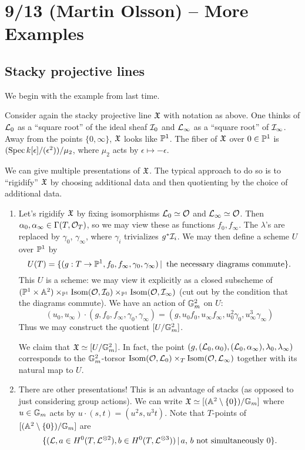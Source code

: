 \documentclass{amsart}
\begin{document}
\section{9/13 (Martin Olsson) -- More Examples}

\subsection{Stacky projective lines}

We begin with the example from last time.

\begin{ex}
	Consider again the stacky projective line $\mathfrak{X}$ with notation as above.
	One thinks of $\mathcal{L}_0$ as a ``square root'' of the ideal sheaf $\mathcal{I}_0$ and $\mathcal{L}_\infty$ as a ``square root'' of $\mathcal{I}_\infty$.
	Away from the points $\{0, \infty\}$, $\mathfrak{X}$ looks like $\mathbb{P}^1$.
	The fiber of $\mathfrak{X}$ over $0 \in \mathbb{P}^1$ is $(\operatorname{Spec} k[\epsilon] / (\epsilon^2)) / \mu_2$, where $\mu_2$ acts by $\epsilon \mapsto -\epsilon$.

	We can give multiple presentations of $\mathfrak{X}$.
	The typical approach to do so is to ``rigidify'' $\mathfrak{X}$ by choosing additional data and then quotienting by the choice of additional data.
	\begin{enumerate}
		\item Let's rigidify $\mathfrak{X}$ by fixing isomorphisms $\mathcal{L}_0 \simeq \mathcal{O}$ and $\mathcal{L}_\infty \simeq \mathcal{O}$.
			Then $\alpha_0, \alpha_\infty \in \Gamma(T, \mathcal{O}_T)$, so we may view these as functions $f_0, f_\infty$.
			The $\lambda$'s are replaced by $\gamma_0$, $\gamma_\infty$, where $\gamma_i$ trivializes $g^* \mathcal{I}_i$.
			We may then define a scheme $U$ over $\mathbb{P}^1$ by
			\[
				U(T) = \{ (g: T \to \mathbb{P}^1, f_0, f_\infty, \gamma_0, \gamma_\infty) \,|\, \textrm{ the necessary diagrams commute} \}.
			\]
			This $U$ is a scheme: we may view it explicitly as a closed subscheme of $(\mathbb{P}^1 \times \mathbb{A}^2) \times_{\mathbb{P}^1} \operatorname{Isom}(\mathcal{O}, \mathcal{I}_0) \times_{\mathbb{P}^1} \operatorname{Isom}(\mathcal{O}, \mathcal{I}_\infty)$ (cut out by the condition that the diagrams commute).
			We have an action of $\mathbb{G}_m^2$ on $U$:
			\[
				(u_0, u_\infty) \cdot (g, f_0, f_\infty, \gamma_0, \gamma_\infty) = (g, u_0 f_0, u_\infty f_\infty, u^2_0 \gamma_0, u_\infty^3 \gamma_\infty)
			\]
			Thus we may construct the quotient $[U / \mathbb{G}_m^2]$.

			We claim that $\mathfrak{X} \simeq [U / \mathbb{G}_m^2]$.
			In fact, the point $(g, (\mathcal{L}_0, \alpha_0), (\mathcal{L}_0, \alpha_\infty), \lambda_0, \lambda_\infty)$ corresponds to the $\mathbb{G}_m^2$-torsor $\operatorname{Isom}(\mathcal{O}, \mathcal{L}_0) \times_T \operatorname{Isom}(\mathcal{O}, \mathcal{L}_\infty)$ together with its natural map to $U$.
		\item There are other presentations!
			This is an advantage of stacks (as opposed to just considering group actions).
			We can write $\mathfrak{X} \simeq [(\mathbb{A}^2 \setminus \{ 0 \}) / \mathbb{G}_m]$ where $u \in \mathbb{G}_m$ acts by $u \cdot (s, t) = (u^2 s, u^3 t)$.
			Note that $T$-points of $[(\mathbb{A}^2 \setminus \{ 0 \}) / \mathbb{G}_m]$ are 
			\[
				\{ (\mathcal{L}, a \in H^0(T, \mathcal{L}^{\otimes 2}), b \in H^0(T, \mathcal{L}^{\otimes 3})) \,|\, \textrm{$a$, $b$ not simultaneously $0$} \}.
			\]


\end{enumerate}
\end{ex}
\end{document}
